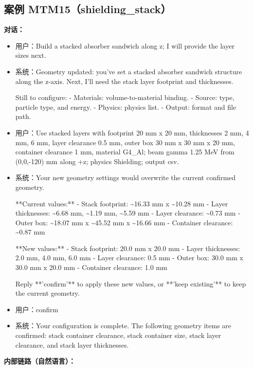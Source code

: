 \documentclass[11pt]{ctexart}
\begin{document}
\subsection{案例 MTM15（shielding\_stack）}
\textbf{对话：}
\begin{itemize}
\item 用户：Build a stacked absorber sandwich along z; I will provide the layer sizes next.
\item 系统：Geometry updated: you've set a stacked absorber sandwich structure along the z-axis. Next, I'll need the stack layer footprint and thicknesses.

Still to configure:
- Materials: volume-to-material binding.
- Source: type, particle type, and energy.
- Physics: physics list.
- Output: format and file path.
\item 用户：Use stacked layers with footprint 20 mm x 20 mm, thicknesses 2 mm, 4 mm, 6 mm, layer clearance 0.5 mm, outer box 30 mm x 30 mm x 20 mm, container clearance 1 mm, material G4\_Al; beam gamma 1.25 MeV from (0,0,-120) mm along +z; physics Shielding; output csv.
\item 系统：Your new geometry settings would overwrite the current confirmed geometry.

**Current values:**
- Stack footprint: \textasciitilde{}16.33 mm x \textasciitilde{}10.28 mm
- Layer thicknesses: \textasciitilde{}6.68 mm, \textasciitilde{}1.19 mm, \textasciitilde{}5.59 mm
- Layer clearance: \textasciitilde{}0.73 mm
- Outer box: \textasciitilde{}18.07 mm x \textasciitilde{}45.52 mm x \textasciitilde{}16.66 mm
- Container clearance: \textasciitilde{}0.87 mm

**New values:**
- Stack footprint: 20.0 mm x 20.0 mm
- Layer thicknesses: 2.0 mm, 4.0 mm, 6.0 mm
- Layer clearance: 0.5 mm
- Outer box: 30.0 mm x 30.0 mm x 20.0 mm
- Container clearance: 1.0 mm

Reply **'confirm'** to apply these new values, or **'keep existing'** to keep the current geometry.
\item 用户：confirm
\item 系统：Your configuration is complete. The following geometry items are confirmed: stack container clearance, stack container size, stack layer clearance, and stack layer thicknesses.
\end{itemize}
\textbf{内部链路（自然语言）：}
\end{document}
